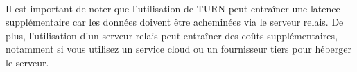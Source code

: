 \paragraph{}
Il est important de noter que l'utilisation de TURN peut entraîner une latence supplémentaire car les données doivent être acheminées via le serveur relais. De plus, l'utilisation d'un serveur relais peut entraîner des coûts supplémentaires, 
notamment si vous utilisez un service cloud ou un fournisseur tiers pour héberger le serveur.
